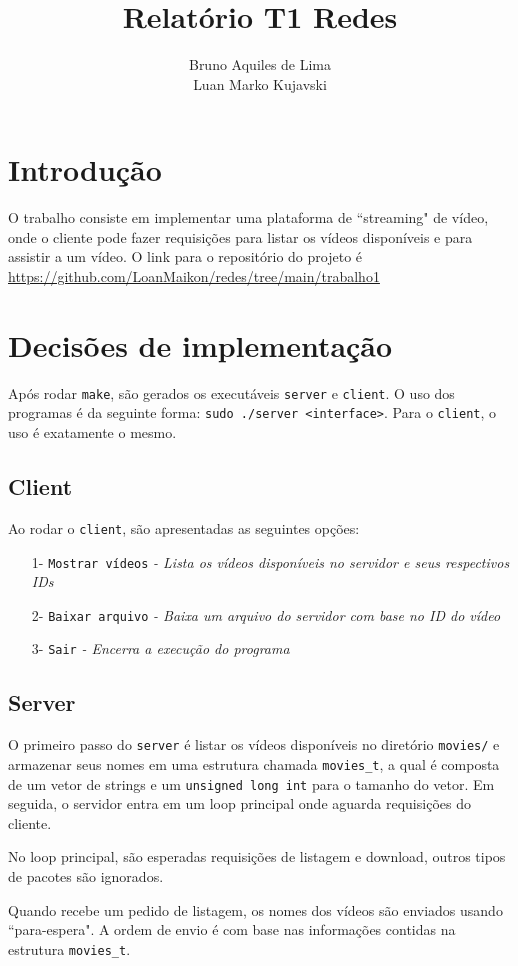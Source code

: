 \documentclass[a4paper, 12pt]{article}
\title{\textbf{Relatório T1 Redes}}
\author{Bruno Aquiles de Lima \\ Luan Marko Kujavski}
\date{}
\begin{document}
\maketitle

\section{Introdução}
O trabalho consiste em implementar uma plataforma de ``streaming" de vídeo, onde o 
cliente pode fazer requisições para listar os vídeos disponíveis e para assistir a
um vídeo. O link para o repositório do projeto é \url{https://github.com/LoanMaikon/redes/tree/main/trabalho1}

\section{Decisões de implementação}
Após rodar \texttt{make}, são gerados os executáveis \texttt{server} e \texttt{client}. 
O uso dos programas é da seguinte forma: \texttt{sudo ./server <interface>}. Para o
\texttt{client}, o uso é exatamente o mesmo.

\subsection{Client}
Ao rodar o \texttt{client}, são apresentadas as seguintes opções:
\begin{enumerate}
    \setlength\itemsep{-0.5em}
    \item[1-]\texttt{Mostrar vídeos} \textit{\small{- Lista os vídeos disponíveis no servidor e seus respectivos IDs}}
    \item[2-]\texttt{Baixar arquivo} \textit{\small{- Baixa um arquivo do servidor com base no ID do vídeo}}
    \item[3-]\texttt{Sair} \textit{\small{- Encerra a execução do programa}}
\end{enumerate}

\subsection{Server}
O primeiro passo do \texttt{server} é listar os vídeos disponíveis no diretório \texttt{movies/} e
armazenar seus nomes em uma estrutura chamada \texttt{movies\_t}, a qual é composta de um vetor de
strings e um \texttt{unsigned long int} para o tamanho do vetor. Em seguida, o servidor entra em um
loop principal onde aguarda requisições do cliente.

No loop principal, são esperadas requisições de listagem e download, outros tipos de pacotes são ignorados.

Quando recebe um pedido de listagem, os nomes dos vídeos são enviados usando ``para-espera".
A ordem de envio é com base nas informações contidas na estrutura \texttt{movies\_t}.
\end{document}

